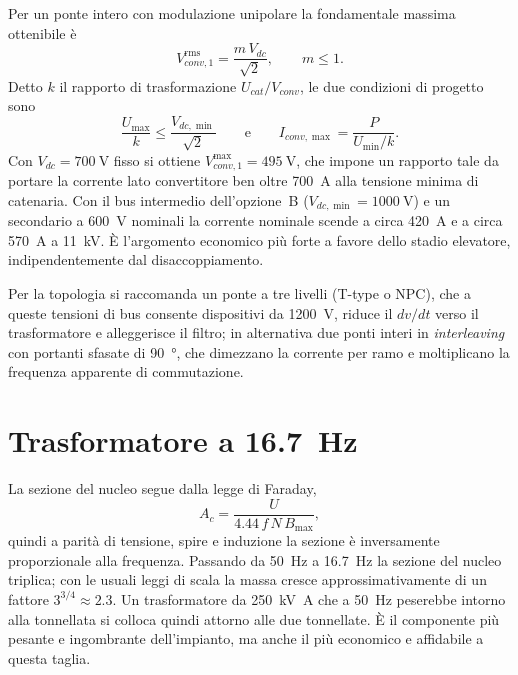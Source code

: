 \documentclass[11pt,a4paper]{article}
\begin{document}
Per un ponte intero con modulazione unipolare la fondamentale massima ottenibile è
\begin{equation}
V_{conv,1}^{\mathrm{rms}} = \frac{m\,V_{dc}}{\sqrt{2}}, \qquad m \le 1 .
\end{equation}
Detto $k$ il rapporto di trasformazione $U_{cat}/V_{conv}$, le due condizioni di progetto
sono
\begin{equation}
\frac{U_{\max}}{k} \le \frac{V_{dc,\min}}{\sqrt{2}}
\qquad\text{e}\qquad
I_{conv,\max} = \frac{P}{U_{\min}/k} .
\end{equation}
Con $V_{dc}=\SI{700}{\volt}$ fisso si ottiene $V_{conv,1}^{\max}=\SI{495}{\volt}$, che
impone un rapporto tale da portare la corrente lato convertitore ben oltre
\SI{700}{\ampere} alla tensione minima di catenaria. Con il bus intermedio dell'opzione~B
($V_{dc,\min}=\SI{1000}{\volt}$) e un secondario a \SI{600}{\volt} nominali la corrente
nominale scende a circa \SI{420}{\ampere} e a circa \SI{570}{\ampere} a
\SI{11}{\kilo\volt}. È l'argomento economico più forte a favore dello stadio elevatore,
indipendentemente dal disaccoppiamento.

Per la topologia si raccomanda un ponte a tre livelli (T-type o NPC), che a queste
tensioni di bus consente dispositivi da \SI{1200}{\volt}, riduce il $dv/dt$ verso il
trasformatore e alleggerisce il filtro; in alternativa due ponti interi in
\emph{interleaving} con portanti sfasate di \SI{90}{\degree}, che dimezzano la corrente
per ramo e moltiplicano la frequenza apparente di commutazione.

\section{Trasformatore a \SI{16.7}{\hertz}}

La sezione del nucleo segue dalla legge di Faraday,
\begin{equation}
A_c = \frac{U}{4.44\, f\, N\, B_{\max}} ,
\end{equation}
quindi a parità di tensione, spire e induzione la sezione è inversamente proporzionale
alla frequenza. Passando da \SI{50}{\hertz} a \SI{16.7}{\hertz} la sezione del nucleo
triplica; con le usuali leggi di scala la massa cresce approssimativamente di un fattore
$3^{3/4}\approx\num{2.3}$. Un trasformatore da \SI{250}{\kilo\volt\ampere} che a
\SI{50}{\hertz} peserebbe intorno alla tonnellata si colloca quindi attorno alle due
tonnellate. È il componente più pesante e ingombrante dell'impianto, ma anche il più
economico e affidabile a questa taglia.
\end{document}
